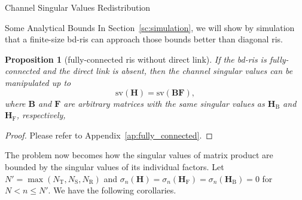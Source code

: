 \documentclass[journal]{IEEEtran}
\newtheorem{proposition}{Proposition}
\begin{document}
\begin{section}{Channel Singular Values Redistribution}
\begin{subsection}{Some Analytical Bounds}
		In Section~\ref{sc:simulation}, we will show by simulation that a finite-size \gls{bd}-\gls{ris} can approach those bounds better than diagonal \gls{ris}.

		\begin{proposition}[fully-connected \gls{ris} without direct link]\label{pp:fully_connected}
			If the \gls{bd}-\gls{ris} is fully-connected and the direct link is absent, then the channel singular values can be manipulated up to
			\begin{equation}
				\mathrm{sv}(\mathbf{H}) = \mathrm{sv}(\mathbf{BF}),
			\end{equation}
			where $\mathbf{B}$ and $\mathbf{F}$ are arbitrary matrices with the same singular values as $\mathbf{H}_\mathrm{B}$ and $\mathbf{H}_\mathrm{F}$, respectively,
		\end{proposition}

		\begin{proof}
			Please refer to Appendix~\ref{ap:fully_connected}.
		\end{proof}

		The problem now becomes how the singular values of matrix product are bounded by the singular values of its individual factors.
		Let $N' = \max(N_\mathrm{T},N_\mathrm{S},N_\mathrm{R})$ and $\sigma_n(\mathbf{H})=\sigma_n(\mathbf{H}_\mathrm{F})=\sigma_n(\mathbf{H}_\mathrm{B})=0$ for $N < n \le N'$.
		We have the following corollaries.


\end{subsection}
\end{section}
\end{document}
